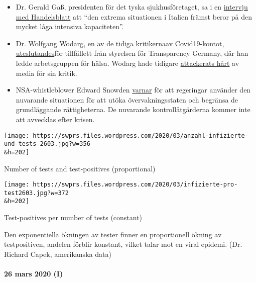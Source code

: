 \begin{itemize}
{  till 75\% asymptomatiska testpositiva personer}.
\item
  Dr. Gerald Gaß, presidenten för det tyska sjukhusföretaget, sa i en
  \href{https://www.handelsblatt.com/politik/deutschland/coronakrise-deutsche-krankenhausgesellschaft-wir-sind-besser-vorbereitet-als-italien/25651268.html}{intervju
  med Handelsblatt} att ``den extrema situationen i Italien främst beror
  på den mycket låga intensiva kapaciteten''.
\item
  Dr. Wolfgang Wodarg, en av de
  \href{https://www.youtube.com/watch?v=p_AyuhbnPOI}{tidiga
  kritikerna}av Covid19-kontot,
  \href{https://www.transparency.de/aktuelles/detail/article/in-eigener-sache-vorstand-beschliesst-ruhen-der-mitgliedschaft-von-wolfgang-wodarg-1/}{uteslutandes}för
  tillfällett från styrelsen för Transparency Germany, där han ledde
  arbetsgruppen för hälsa. Wodarg hade tidigare
  \href{https://www.youtube.com/watch?v=xcirqmhBCvk}{attackerats hårt}
  av media för sin kritik.
\item
  NSA-whistleblower Edward Snowden
  \href{https://www.futurezone.de/digital-life/article228779795/Gefaehrliche-weltweite-Entwicklung-Edward-Snowden-warnt-vor-Ueberwachung.html}{varnar}
  för att regeringar använder den nuvarande situationen för att utöka
  övervakningsstaten och begränsa de grundläggande rättigheterna. De
  nuvarande kontrollåtgärderna kommer inte att avvecklas efter krisen.
\end{itemize}

\href{https://swprs.org/a-swiss-doctor-on-covid-19/anzahl-infizierte-und-tests-2603/}{}

\texttt{[image: https://swprs.files.wordpress.com/2020/03/anzahl-infizierte-und-tests-2603.jpg?w=356\\\&h=202]}

Number of tests and test-positives (proportional)

\href{https://swprs.org/covid-19-hinweis-ii/infizierte-pro-test2603/}{}

\texttt{[image: https://swprs.files.wordpress.com/2020/03/infizierte-pro-test2603.jpg?w=372\\\&h=202]}

Test-positives per number of tests (constant)

Den exponentiella ökningen av tester finner en proportionell ökning av
testpositiven, andelen förblir konstant, vilket talar mot en viral
epidemi. (Dr. Richard Capek, amerikanska data)

\hypertarget{26-mars-2020-i}{%
\paragraph{26 mars 2020 (I)}\label{26-mars-2020-i}}

